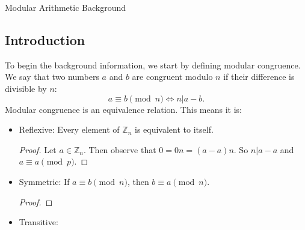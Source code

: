 \documentclass{article}
\begin{document}
    \huge Modular Arithmetic Background
    \normalsize
\begin{enumerate} 

    \section{Introduction}

    To begin the background information, we start by defining modular congruence. We say that two numbers $a$ and $b$ are congruent modulo $n$ if their difference is divisible by $n$:
    \[
    a\equiv b\pmod{n}\iff n|a-b
    .\] 
    Modular congruence is an equivalence relation. This means it is:
    \begin{itemize}
        \item Reflexive: Every element of $\mathbb{Z}_n$ is equivalent to itself.
            \begin{proof} 
                Let $a\in \mathbb{Z}_n$. Then observe that $0=0n=(a-a)n$. So $n|a-a$ and $a\equiv a\pmod{p}$.
            \end{proof}
        \item Symmetric: If $a\equiv b\pmod{n}$, then $b\equiv a \pmod{ n   }$.
            \begin{proof} 
                
            \end{proof}
        \item Transitive:
    \end{itemize}

\end{enumerate}
\end{document}
